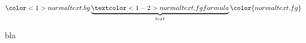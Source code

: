 \documentclass{beamer}
\begin{document}
\begin{frame}

\[
\color<1>{normal text.bg}
\underbrace{\textcolor<1-2>{normal text.fg}{formula}}_{text}
\color{normal text.fg}
\]

bla

\end{frame} 
\end{document}
